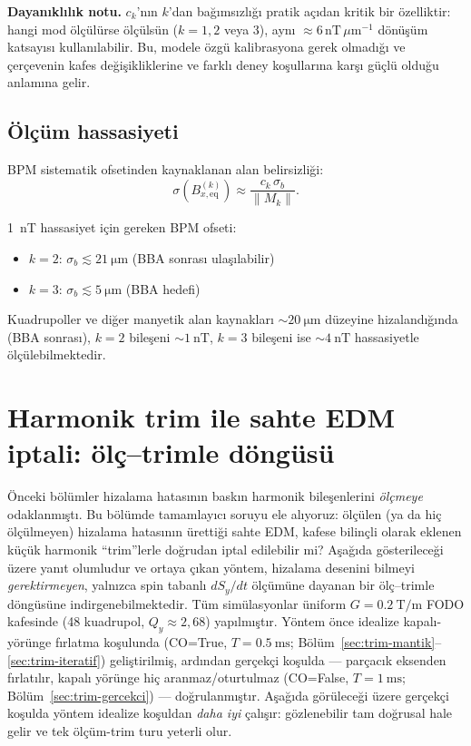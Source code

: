 \documentclass[preprint,12pt]{elsarticle}
\begin{document}
\textbf{Dayanıklılık notu.} $c_k$'nın $k$'dan bağımsızlığı pratik açıdan
kritik bir özelliktir: hangi mod ölçülürse ölçülsün ($k=1,2$ veya $3$),
aynı $\approx6\,\mathrm{nT}\,\mu\mathrm{m}^{-1}$ dönüşüm katsayısı
kullanılabilir. Bu, modele özgü kalibrasyona gerek olmadığı ve çerçevenin
kafes değişikliklerine ve farklı deney koşullarına karşı güçlü olduğu
anlamına gelir.

\subsection{Ölçüm hassasiyeti}

BPM sistematik ofsetinden kaynaklanan alan belirsizliği:
\begin{equation}
  \sigma(B_{x,\mathrm{eq}}^{(k)}) \approx
  \frac{c_k\,\sigma_b}{\|M_k\|}.
\end{equation}

1~nT hassasiyet için gereken BPM ofseti:
\begin{itemize}
  \item $k=2$: $\sigma_b\lesssim\SI{21}{\micro\meter}$ (BBA sonrası ulaşılabilir)
  \item $k=3$: $\sigma_b\lesssim\SI{5}{\micro\meter}$ (BBA hedefi)
\end{itemize}

Kuadrupoller ve diğer manyetik alan kaynakları $\sim\SI{20}{\micro\meter}$
düzeyine hizalandığında (BBA sonrası), $k=2$ bileşeni $\sim\SI{1}{\nano\tesla}$,
$k=3$ bileşeni ise $\sim\SI{4}{\nano\tesla}$ hassasiyetle ölçülebilmektedir.

\section{Harmonik trim ile sahte EDM iptali: ölç--trimle döngüsü}
\label{sec:trim}

Önceki bölümler hizalama hatasının baskın harmonik bileşenlerini
\emph{ölçmeye} odaklanmıştı. Bu bölümde tamamlayıcı soruyu ele alıyoruz:
ölçülen (ya da hiç ölçülmeyen) hizalama hatasının ürettiği sahte EDM,
kafese bilinçli olarak eklenen küçük harmonik ``trim''lerle doğrudan
iptal edilebilir mi? Aşağıda gösterileceği üzere yanıt olumludur ve ortaya
çıkan yöntem, hizalama desenini bilmeyi \emph{gerektirmeyen}, yalnızca
spin tabanlı $dS_y/dt$ ölçümüne dayanan bir ölç--trimle döngüsüne
indirgenebilmektedir. Tüm simülasyonlar üniform
$G=\SI{0.2}{\tesla\per\meter}$ FODO kafesinde (48 kuadrupol,
$Q_y\approx2{,}68$) yapılmıştır. Yöntem önce idealize kapalı-yörünge
fırlatma koşulunda (CO=True, $T=\SI{0.5}{\milli\second}$;
Bölüm~\ref{sec:trim-mantik}--\ref{sec:trim-iteratif}) geliştirilmiş,
ardından gerçekçi koşulda --- parçacık eksenden fırlatılır, kapalı
yörünge hiç aranmaz/oturtulmaz (CO=False, $T=\SI{1}{\milli\second}$;
Bölüm~\ref{sec:trim-gercekci}) --- doğrulanmıştır. Aşağıda görüleceği
üzere gerçekçi koşulda yöntem idealize koşuldan \emph{daha iyi} çalışır:
gözlenebilir tam doğrusal hale gelir ve tek ölçüm-trim turu yeterli olur.
\end{document}

